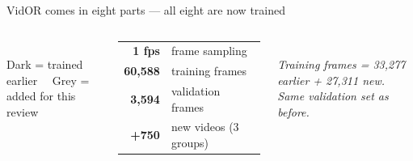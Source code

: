\documentclass[aspectratio=169,11pt]{beamer}
\begin{document}
\begin{frame}{VidOR comes in eight parts --- all eight are now trained}
  \centering
  \begin{columns}[T]
      \centering
      \\[6pt]
      {\scriptsize\color{mute} Dark = trained earlier \ \ Grey = added for this review}
      \centering
      \begin{tabular}{@{}rl@{}}
        {\LARGE\bfseries\color{amber}1 fps} & frame sampling\\[5pt]
        {\LARGE\bfseries\color{amber}60,588} & training frames\\[5pt]
        {\LARGE\bfseries\color{amber}3,594} & validation frames\\[5pt]
        {\LARGE\bfseries\color{amber}+750} & new videos (3 groups)
      \end{tabular}\\[8pt]
      {\scriptsize\color{mute}\itshape Training frames = 33,277 earlier + 27,311 new. Same validation set as before.}
  \end{columns}
\end{frame}
\end{document}
